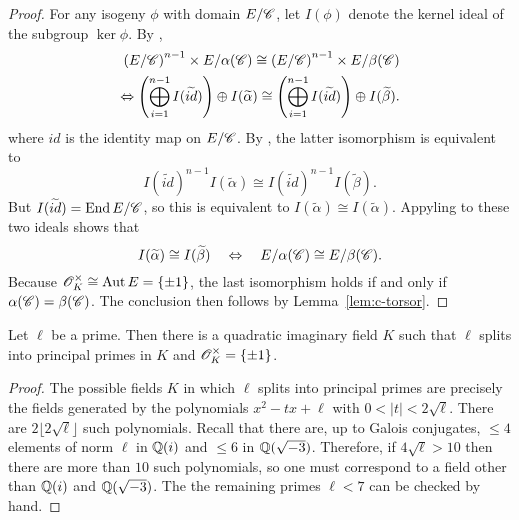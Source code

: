 \documentclass{amsart}
\begin{document}
\begin{proof}
  For any isogeny $\phi$ with domain $E/\mathscr{C}$, let $I(\phi)$ denote the kernel ideal of the subgroup $\ker\phi$.
  By \cite[Thm.~46]{kani2011products},
  \begin{align*}
    \left(E/\mathscr{C}\right)^{n-1} \times E/\alpha(\mathscr{C}) \cong \left(E/\mathscr{C}\right)^{n-1} \times E/\beta(\mathscr{C})
    \\
    \Leftrightarrow
    \left(\bigoplus_{i=1}^{n-1} I(\widetilde{id})\right) \oplus I(\widetilde{\alpha}) \cong \left(\bigoplus_{i=1}^{n-1} I(\widetilde{id})\right) \oplus I(\widetilde{\beta}).
  \end{align*}
  where $id$ is the identity map on $E/\mathscr{C}$. By \cite[Thm.~48]{kani2011products}, the latter isomorphism is equivalent to
  \[
    I(\tilde{id})^{n-1}I(\tilde{\alpha}) \cong I(\tilde{id})^{n-1}I(\tilde{\beta}).
  \]
  But $I(\widetilde{id}) = \operatorname{End} E/\mathscr{C}$, so this is equivalent to $I(\tilde{\alpha}) \cong I(\tilde{\alpha})$. Appyling \cite[Thm.~46]{kani2011products} to these two ideals shows that
  \[
    I(\widetilde{\alpha}) \cong I(\widetilde{\beta})
    \quad\Leftrightarrow\quad
    E/\alpha(\mathscr{C}) \cong E/\beta(\mathscr{C}).
  \]
  Because $\mathscr{O}_K^\times \cong \operatorname{Aut} E = \{\pm 1\}$, the last isomorphism holds if and only if $\alpha(\mathscr{C}) = \beta(\mathscr{C})$. The conclusion then follows by Lemma~\ref{lem:c-torsor}.
\end{proof}

\begin{lemma}\label{lem:silly}
  Let $\ell$ be a prime. Then there is a quadratic imaginary field $K$ such that $\ell$ splits into principal primes in $K$ and $\mathscr{O}_K^\times = \{\pm 1\}$.
\end{lemma}
\begin{proof}
  The possible fields $K$ in which $\ell$ splits into principal primes are precisely the fields generated by the polynomials $x^2 - tx + \ell$ with $0 < |t| < 2\sqrt{\ell}$. There are $2\lfloor 2\sqrt{\ell} \rfloor$ such polynomials. Recall that there are, up to Galois conjugates, $\leq 4$ elements of norm $\ell$ in $\mathbb{Q}(i)$ and $\leq 6$ in $\mathbb{Q}(\sqrt{-3})$. Therefore, if $4\sqrt{\ell} > 10$ then there are more than $10$ such polynomials, so one must correspond to a field other than $\mathbb{Q}(i)$ and $\mathbb{Q}(\sqrt{-3})$. The the remaining primes $\ell < 7$ can be checked by hand.
\end{proof}
\end{document}
